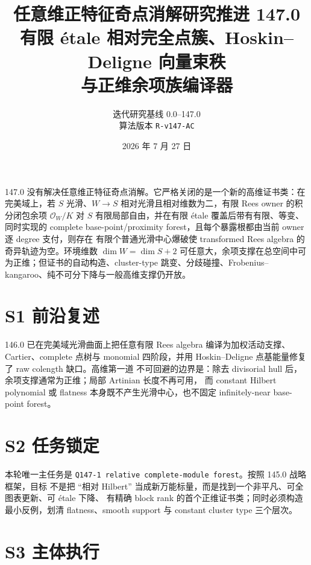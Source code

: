 \documentclass[11pt,a4paper,fontset=fandol]{ctexart}
\title{任意维正特征奇点消解研究推进 147.0\\[0.4em]
\Large 有限 étale 相对完全点簇、Hoskin--Deligne 向量束秩\\与正维余项族编译器}
\author{迭代研究基线 0.0--147.0\\算法版本 \texttt{R-v147-AC}}
\date{2026 年 7 月 27 日}
\newcommand{\cO}{\mathcal O}
\begin{document}
\maketitle
\begin{tcolorbox}[title=真实性边界]
147.0 没有解决任意维正特征奇点消解。它严格关闭的是一个新的高维证书类：在完美域上，若
$S$ 光滑、$W\to S$ 相对光滑且相对维数为二，有限 Rees owner 的积分闭包余项
$\cO_W/K$ 对 $S$ 有限局部自由，并在有限 étale 覆盖后带有有限、等变、同时实现的
complete base-point/proximity forest，且每个暴露根都由当前 owner 逐 degree 支付，则存在
有限个普通光滑中心爆破使 transformed Rees algebra 的奇异轨迹为空。环境维数
$\dim W=\dim S+2$ 可任意大，余项支撑在总空间中可为正维；但证书的自动构造、cluster-type
跳变、分歧碰撞、Frobenius--kangaroo、纯不可分下降与一般高维支撑仍开放。
\end{tcolorbox}
\tableofcontents
\newpage

\section{S1 前沿复述}
146.0 已在完美域光滑曲面上把任意有限 Rees algebra 编译为加权活动支撑、Cartier、complete
点树与 monomial 四阶段，并用 Hoskin--Deligne 点基能量修复了 raw colength 缺口。高维第一道
不可回避的边界是：除去 divisorial hull 后，余项支撑通常为正维；局部 Artinian 长度不再可用，
而 constant Hilbert polynomial 或 flatness 本身既不产生光滑中心，也不固定 infinitely-near
base-point forest。

\section{S2 任务锁定}
本轮唯一主任务是 \texttt{Q147-1 relative complete-module forest}。按照 145.0 战略框架，目标
不是把 ``相对 Hilbert'' 当成新万能标量，而是找到一个非平凡、可全图表更新、可 étale 下降、
有精确 block rank 的首个正维证书类；同时必须构造最小反例，划清 flatness、smooth support 与
constant cluster type 三个层次。

\section{S3 主体执行}
\end{document}
